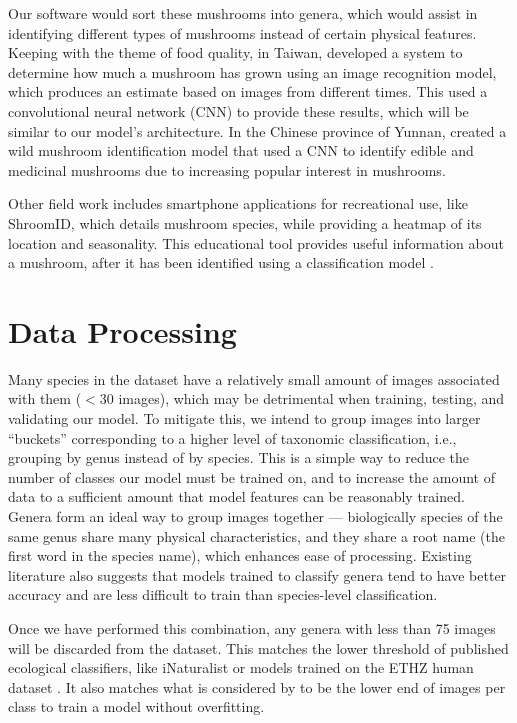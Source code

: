 \documentclass{article} %
\begin{document}
Our software would sort these mushrooms into genera, which would assist in identifying different types of mushrooms instead of certain physical features. Keeping with the theme of food quality, in Taiwan, \cite{LuLiawEtAl.DevelopmentMushroomGrowth.2019} developed a system to determine how much a mushroom has grown using an image recognition model, which produces an estimate based on images from different times. This used a convolutional neural network (CNN) to provide these results, which will be similar to our model's architecture. In the Chinese province of Yunnan, \cite{H.ZhaoF.GeEtAl.IdentificationWildMushroom.2021} created a wild mushroom identification model that used a CNN to identify edible and medicinal mushrooms due to increasing popular interest in mushrooms.

Other field work includes smartphone applications for recreational use, like ShroomID, which details mushroom species, while providing a heatmap of its location and seasonality. This educational tool provides useful information about a mushroom, after it has been identified using a classification model \citep{.ShroomID.2023}.

\section{Data Processing}
\label{data}

Many species in the dataset have a relatively small amount of images associated with them ($<30$ images), which may be detrimental when training, testing, and validating our model. To mitigate this, we intend to group images into larger “buckets” corresponding to a higher level of taxonomic classification, i.e., grouping by genus instead of by species. This is a simple way to reduce the number of classes our model must be trained on, and to increase the amount of data to a sufficient amount that model features can be reasonably trained. Genera form an ideal way to group images together — biologically species of the same genus share many physical characteristics, and they share a root name (the first word in the species name), which enhances ease of processing. Existing literature \citep{HollisterCaiEtAl.UsingComputerVision.2023} also suggests that models trained to classify genera tend to have better accuracy and are less difficult to train than species-level classification.

Once we have performed this combination, any genera with less than 75 images will be discarded from the dataset. This matches the lower threshold of published ecological classifiers, like iNaturalist \citep{Shepard.LatestComputerVision.2022} or models trained on the ETHZ human dataset \citep{SchneiderTaylorEtAl.PresentFutureApproaches.2019}. It also matches what is considered by \cite{FarleyMehrotaEtAl.ImprovingYourModel.2024} to be the lower end of images per class to train a model without overfitting.
\end{document}
